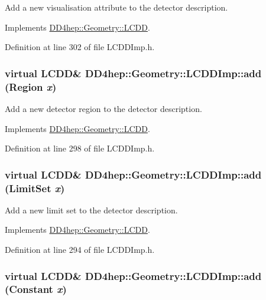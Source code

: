 Add a new visualisation attribute to the detector description. 

Implements \hyperlink{class_d_d4hep_1_1_geometry_1_1_l_c_d_d_a4913f783de23fed9eb9dc11678226aa8}{DD4hep::Geometry::LCDD}.

Definition at line 302 of file LCDDImp.h.\hypertarget{class_d_d4hep_1_1_geometry_1_1_l_c_d_d_imp_ab8c4f8e119f235e5f050349b19892d47}{
\subsubsection[{add}]{\setlength{\rightskip}{0pt plus 5cm}virtual {\bf LCDD}\& DD4hep::Geometry::LCDDImp::add ({\bf Region} {\em x})}}
\label{class_d_d4hep_1_1_geometry_1_1_l_c_d_d_imp_ab8c4f8e119f235e5f050349b19892d47}


Add a new detector region to the detector description. 

Implements \hyperlink{class_d_d4hep_1_1_geometry_1_1_l_c_d_d_a618c1268be853682f6da33777aae71a8}{DD4hep::Geometry::LCDD}.

Definition at line 298 of file LCDDImp.h.\hypertarget{class_d_d4hep_1_1_geometry_1_1_l_c_d_d_imp_acd0d23dbb73da1b5b16169443f9fb975}{
\subsubsection[{add}]{\setlength{\rightskip}{0pt plus 5cm}virtual {\bf LCDD}\& DD4hep::Geometry::LCDDImp::add ({\bf LimitSet} {\em x})}}
\label{class_d_d4hep_1_1_geometry_1_1_l_c_d_d_imp_acd0d23dbb73da1b5b16169443f9fb975}


Add a new limit set to the detector description. 

Implements \hyperlink{class_d_d4hep_1_1_geometry_1_1_l_c_d_d_a2b6a8c58332d26518c9def51f1acbc0d}{DD4hep::Geometry::LCDD}.

Definition at line 294 of file LCDDImp.h.\hypertarget{class_d_d4hep_1_1_geometry_1_1_l_c_d_d_imp_aad80a2a7fab34d16dfdc2da299076dab}{
\subsubsection[{add}]{\setlength{\rightskip}{0pt plus 5cm}virtual {\bf LCDD}\& DD4hep::Geometry::LCDDImp::add ({\bf Constant} {\em x})}}
\label{class_d_d4hep_1_1_geometry_1_1_l_c_d_d_imp_aad80a2a7fab34d16dfdc2da299076dab}


